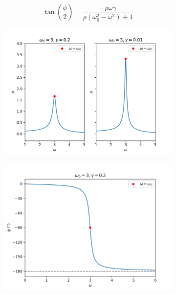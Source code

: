 \begin{dmath}
    \tan(\frac{\phi}{2}) = \frac{-\rho\omega\gamma}{\rho(\omega_0^2 - \omega^2) + 1}
\end{dmath}
%
\begin{figure}[!t]
    \centering
    \begin{subfigure}[b]{0.45\textwidth}
         \centering
         \includegraphics[width=\textwidth]{images/harmonique/rho_plot_contrast.png}
         \caption{}
         \label{fig:lorentzian}
     \end{subfigure}  
     \begin{subfigure}[b]{0.45\textwidth}
         \centering
         \includegraphics[width=\textwidth]{images/harmonique/frequency_phase_shift.png}
         \caption{}
         \label{fig:phase_shift}
     \end{subfigure}  
    

\end{figure}
